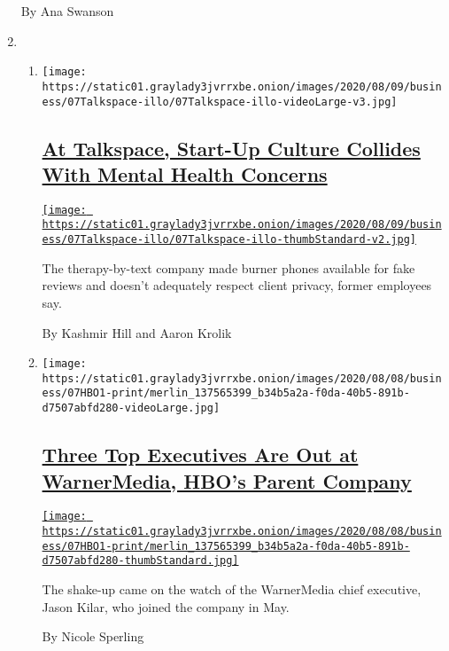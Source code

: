 \begin{enumerate}
  By Ana Swanson
\item
  \begin{enumerate}
  \def\labelenumii{\arabic{enumii}.}
  \item
    \texttt{[image: https://static01.graylady3jvrrxbe.onion/images/2020/08/09/business/07Talkspace-illo/07Talkspace-illo-videoLarge-v3.jpg]}

    \hypertarget{at-talkspace-start-up-culture-collides-with-mental-health-concerns}{%
    \subsection{\texorpdfstring{\href{/2020/08/07/technology/talkspace.html}{At
    Talkspace, Start-Up Culture Collides With Mental Health
    Concerns}}{At Talkspace, Start-Up Culture Collides With Mental Health Concerns}}\label{at-talkspace-start-up-culture-collides-with-mental-health-concerns}}

    \href{/2020/08/07/technology/talkspace.html}{\texttt{[image: https://static01.graylady3jvrrxbe.onion/images/2020/08/09/business/07Talkspace-illo/07Talkspace-illo-thumbStandard-v2.jpg]}}

    The therapy-by-text company made burner phones available for fake
    reviews and doesn't adequately respect client privacy, former
    employees say.

    By Kashmir Hill and Aaron Krolik
  \item
    \texttt{[image: https://static01.graylady3jvrrxbe.onion/images/2020/08/08/business/07HBO1-print/merlin\_137565399\_b34b5a2a-f0da-40b5-891b-d7507abfd280-videoLarge.jpg]}

    \hypertarget{three-top-executives-are-out-at-warnermedia-hbos-parent-company}{%
    \subsection{\texorpdfstring{\href{/2020/08/07/business/media/hbo-warnermedia-executive-departure.html}{Three
    Top Executives Are Out at WarnerMedia, HBO's Parent
    Company}}{Three Top Executives Are Out at WarnerMedia, HBO's Parent Company}}\label{three-top-executives-are-out-at-warnermedia-hbos-parent-company}}

    \href{/2020/08/07/business/media/hbo-warnermedia-executive-departure.html}{\texttt{[image: https://static01.graylady3jvrrxbe.onion/images/2020/08/08/business/07HBO1-print/merlin\_137565399\_b34b5a2a-f0da-40b5-891b-d7507abfd280-thumbStandard.jpg]}}

    The shake-up came on the watch of the WarnerMedia chief executive,
    Jason Kilar, who joined the company in May.

    By Nicole Sperling
  \end{enumerate}
\end{enumerate}


